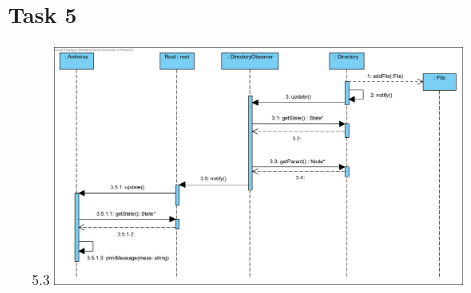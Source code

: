 \documentclass{article}
\begin{document}
\subsection*{Task 5}
\begin{itemize}
    \item[5.3]\includegraphics[width=0.85\textwidth]{Task53.png} 
\end{itemize}
\end{document}
